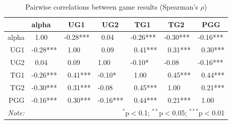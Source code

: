 \documentclass[12pt]{article}
\begin{document}
\begin{table}[!htbp] \centering 
  \caption{Pairwise correlations between game results (Spearman\rq s \(\rho\))} 
  \label{} \centering
  \begin{tabular}{rllllll}
  \hline
 & alpha &  \ UG1 & \ UG2 & \ TG1 & \ TG2 & \ PGG \\ 
  \hline
alpha &   \ 1.00  & -0.28*** & \ 0.04  & -0.26*** & -0.30*** & -0.16*** \\ 
  UG1 & -0.28*** & \ 1.00  &  \ 0.09  & \ 0.41*** & \ 0.31*** &  \ 0.30*** \\ 
  UG2 &  \ 0.04  &  \ 0.09  &  1.00  & -0.10* & -0.08  & -0.16*** \\ 
  TG1 & -0.26*** & \  0.41*** & -0.10* & \ 1.00  & \ 0.45*** &  \ 0.44*** \\ 
  TG2 & -0.30*** &  \ 0.31*** & -0.08  &  \ 0.45*** & \ 1.00  &  \ 0.21*** \\ 
  PGG & -0.16*** &  \ 0.30*** & -0.16*** & \  0.44*** & \ 0.21*** &  \ 1.00  \\ 
   \hline
      \textit{Note:}  & \multicolumn{6}{r}{$^{*}$p$<$0.1; $^{**}$p$<$0.05; $^{***}$p$<$0.01} \\ 
\end{tabular}
\end{table}
\end{document}
